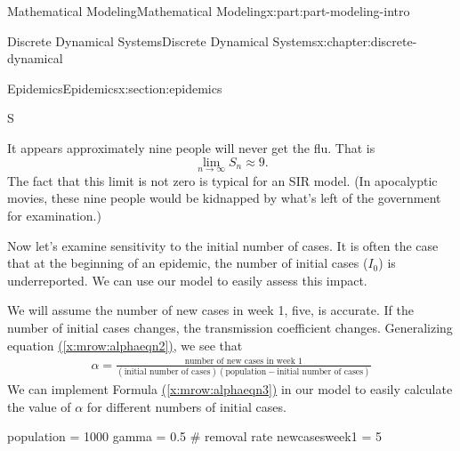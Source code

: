 \documentclass[oneside,10pt,]{book}
\newcommand{\xreffont}{\relax}
\numberwithin{equation}{section}
\begin{document}
\begin{partptx}{Mathematical Modeling}{}{Mathematical Modeling}{}{}{x:part:part-modeling-intro}
\begin{chapterptx}{Discrete Dynamical Systems}{}{Discrete Dynamical Systems}{}{}{x:chapter:discrete-dynamical}
\begin{sectionptx}{Epidemics}{}{Epidemics}{}{}{x:section:epidemics}
\begin{sageinput}
S
\end{sageinput}
\begin{sageoutput}
[997,
 992.005030000000,
 981.245148340803,
 958.291565179937,
 910.349546204527,
 814.692301587283,
 641.744252119348,
 388.276826046222,
 147.244741940060,
 42.2724215836508,
 19.7936802200344,
 13.7879014273983,
 11.5578579155443,
 10.5801353765636,
 10.1153535054228,
 9.88532003431096,
 9.76912139282374,
 9.70980929530723,
 9.67937153154970,
 9.66370834419732,
 9.65563664495684,
 9.65147401086667,
 9.64932649792016,
 9.64821837453491,
 9.64764652180503,
 9.64735139894192]
\end{sageoutput}
It appears approximately nine people will never get the flu.  That is%
\begin{equation*}
\lim_{n\to\infty} S_n \approx 9.
\end{equation*}
The fact that this limit is not zero is typical for an SIR model. (In apocalyptic movies, these nine people would be kidnapped by what's left of the government for examination.)%
\par
Now let's examine sensitivity to the initial number of cases.  It is often the case that at the beginning of an epidemic, the number of initial cases (\(I_0\)) is underreported. We can use our model to easily assess this impact.%
\par
We will assume the number of new cases in week 1, five, is accurate. If the number of initial cases changes, the transmission coefficient changes.  Generalizing equation \hyperref[x:mrow:alphaeqn2]{({\xreffont\ref{x:mrow:alphaeqn2}})}, we see that%
%
\begin{gather}
\alpha = \frac{\text{number of new cases in week 1}}{(\text{initial number of cases})(\text{population} - \text{initial number of cases})}\label{x:mrow:alphaeqn3}
\end{gather}
We can implement Formula \hyperref[x:mrow:alphaeqn3]{({\xreffont\ref{x:mrow:alphaeqn3}})} in our model to easily calculate the value of \(\alpha\) for different numbers of initial cases.%
\begin{sageinput}
population = 1000
gamma = 0.5 # removal rate
newcasesweek1 = 5 


\end{sageinput}
\end{sectionptx}
\end{chapterptx}
\end{partptx}
\end{document}
